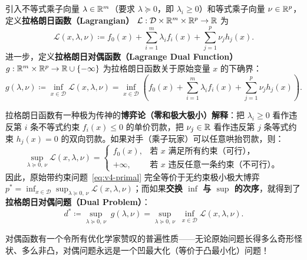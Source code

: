 \begin{defBox}
\begin{definition}[拉格朗日函数与对偶函数]\label{def:v4-lagrangian}
引入不等式乘子向量 $\lambda \in \mathbb{R}^m$（要求 $\lambda \succeq 0$，即 $\lambda_i \ge 0$）和等式乘子向量 $\nu \in \mathbb{R}^p$，定义\textbf{拉格朗日函数（Lagrangian）} $\mathcal{L}: \mathcal{D} \times \mathbb{R}^m \times \mathbb{R}^p \to \mathbb{R}$ 为
\begin{equation}\label{eq:v4-lagrangian}
  \mathcal{L}(x, \lambda, \nu) \coloneqq f_0(x) + \sum_{i=1}^m \lambda_i f_i(x) + \sum_{j=1}^p \nu_j h_j(x).
\end{equation}
进一步，定义\textbf{拉格朗日对偶函数（Lagrange Dual Function）} $g: \mathbb{R}^m \times \mathbb{R}^p \to \mathbb{R} \cup \{-\infty\}$ 为拉格朗日函数关于原始变量 $x$ 的下确界：
\begin{equation}\label{eq:v4-dual-fn}
  g(\lambda, \nu) \coloneqq \inf_{x \in \mathcal{D}} \mathcal{L}(x, \lambda, \nu)
  = \inf_{x \in \mathcal{D}} \left(f_0(x) + \sum_{i=1}^m \lambda_i f_i(x) + \sum_{j=1}^p \nu_j h_j(x)\right).
\end{equation}
\end{definition}
\end{defBox}

拉格朗日函数有一种极为传神的\textbf{博弈论（零和极大极小）解释}：把 $\lambda_i \ge 0$ 看作违反第 $i$ 条不等式约束 $f_i(x) \le 0$ 的单价罚款，把 $\nu_j \in \mathbb{R}$ 看作违反第 $j$ 条等式约束 $h_j(x) = 0$ 的双向罚款。如果对手（乘子玩家）可以任意哄抬罚款，则：
\[
  \sup_{\lambda \succeq 0,\, \nu} \mathcal{L}(x, \lambda, \nu) =
  \begin{cases}
    f_0(x), & \text{若 } x \text{ 满足所有约束（可行），}\\
    +\infty, & \text{若 } x \text{ 违反任意一条约束（不可行）。}
  \end{cases}
\]
因此，原始带约束问题~\eqref{eq:v4-primal} 完全等价于无约束极小极大博弈 $p^* = \inf_{x\in\mathcal{D}} \sup_{\lambda \succeq 0,\, \nu} \mathcal{L}(x, \lambda, \nu)$；而如果\textbf{交换 $\inf$ 与 $\sup$ 的次序}，就得到了\textbf{拉格朗日对偶问题（Dual Problem）}：
\begin{equation}\label{eq:v4-dual-prob}
  d^* \coloneqq \sup_{\lambda \succeq 0,\, \nu}\; g(\lambda, \nu) = \sup_{\lambda \succeq 0,\, \nu}\;\inf_{x \in \mathcal{D}} \mathcal{L}(x, \lambda, \nu).
\end{equation}

对偶函数有一个令所有优化学家赞叹的普遍性质——无论原始问题长得多么奇形怪状、多么非凸，对偶问题永远是一个凹最大化（等价于凸最小化）问题！


